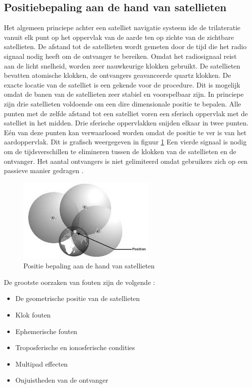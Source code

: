 \subsection{Positiebepaling aan de hand van satellieten}
\label{LPbS}
Het algemeen princiepe achter een satelliet navigatie systeem ide de trilateratie vanuit elk punt op het oppervlak van de aarde ten op zichte van de zichtbare satellieten.  De afstand tot de satellieten wordt gemeten door de tijd die het radio signaal nodig heeft om de ontvanger te bereiken. Omdat het radiosignaal reist aan de licht snelheid, worden zeer nauwkeurige klokken gebruikt. De satellieten bevatten atomische klokken, de ontvangers geavanceerde quartz klokken. De exacte locatie van de satelliet is een gekende voor de procedure. Dit is mogelijk omdat de banen van de satellieten zeer stabiel en voorspelbaar zijn. In princiepe zijn drie satellieten voldoende om een dire dimensionale positie te bepalen. Alle punten met de zelfde afstand tot een satelliet voren een sferisch oppervlak met de satelliet in het midden. Drie sferische oppervlakken snijden elkaar in twee punten. E\'en van deze punten kan verwaarloosd worden omdat de positie te ver is van het aardoppervlak. Dit is grafisch weergegeven in figuur \ref{imgPbS} Een vierde signaal is nodig om de tijdsverschillen te elimineren tussen de klokken van de satellieten en de ontvanger. Het aantal ontvangers is niet gelimiteerd omdat gebruikers zich op een passieve manier gedragen \cite{LBibGNSS8}. 
\begin{figure}[hpb]
	\includegraphics[scale=1.75]{BepalingPositie.jpg}
	\caption{Positie bepaling aan de hand van satellieten \cite{LBibSat}}
	\label{imgPbS}
\end{figure} 
De grootste oorzaken van fouten zijn de volgende \cite{LBibGNSS8}:
\begin{itemize}
	\item De geometrische positie van de satellieten
	\item Klok fouten
	\item Ephemerische fouten
	\item Troposferische en ionosferische condities
	\item Multipad effecten
	\item Onjuistheden van de ontvanger
\end{itemize}

